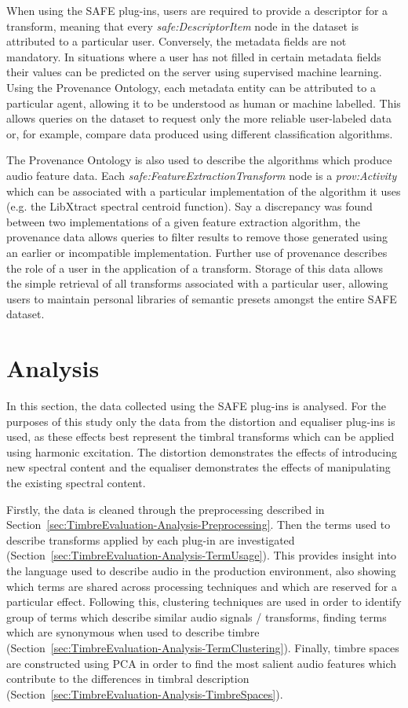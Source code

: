 		When using the SAFE plug-ins, users are required to provide a descriptor for a transform, meaning that
		every \emph{safe:DescriptorItem} node in the dataset is attributed to a particular user. Conversely, the
		metadata fields are not mandatory. In situations where a user has not filled in certain metadata fields
		their values can be predicted on the server using supervised machine learning. Using the Provenance
		Ontology, each metadata entity can be attributed to a particular agent, allowing it to be understood as
		human or machine labelled. This allows queries on the dataset to request only the more reliable
		user-labeled data or, for example, compare data produced using different classification algorithms.

		The Provenance Ontology is also used to describe the algorithms which produce audio feature data. Each
		\emph{safe:FeatureExtractionTransform} node is a \emph{prov:Activity} which can be associated with a
		particular implementation of the algorithm it uses (e.g. the LibXtract \citep{bullock2007libxtract}
		spectral centroid function). Say a discrepancy was found between two implementations of a given feature
		extraction algorithm, the provenance data allows queries to filter results to remove those generated using
		an earlier or incompatible implementation. Further use of provenance describes the role of a user in the
		application of a transform. Storage of this data allows the simple retrieval of all transforms associated
		with a particular user, allowing users to maintain personal libraries of semantic presets amongst the
		entire SAFE dataset.

\section{Analysis}
\label{sec:TimbreEvaluation-Analysis}
	In this section, the data collected using the SAFE plug-ins is analysed. For the purposes of this study only the
	data from the distortion and equaliser plug-ins is used, as these effects best represent the timbral transforms
	which can be applied using harmonic excitation. The distortion demonstrates the effects of introducing new spectral
	content and the equaliser demonstrates the effects of manipulating the existing spectral content.

	Firstly, the data is cleaned through the preprocessing described in
	Section~\ref{sec:TimbreEvaluation-Analysis-Preprocessing}. Then the terms used to describe transforms applied by
	each plug-in are investigated (Section~\ref{sec:TimbreEvaluation-Analysis-TermUsage}). This provides insight into
	the language used to describe audio in the production environment, also showing which terms are shared across
	processing techniques and which are reserved for a particular effect. Following this, clustering techniques are
	used in order to identify group of terms which describe similar audio signals / transforms, finding terms which are
	synonymous when used to describe timbre (Section~\ref{sec:TimbreEvaluation-Analysis-TermClustering}). Finally,
	timbre spaces are constructed using PCA in order to find the most salient audio features which contribute to the
	differences in timbral description (Section~\ref{sec:TimbreEvaluation-Analysis-TimbreSpaces}).

